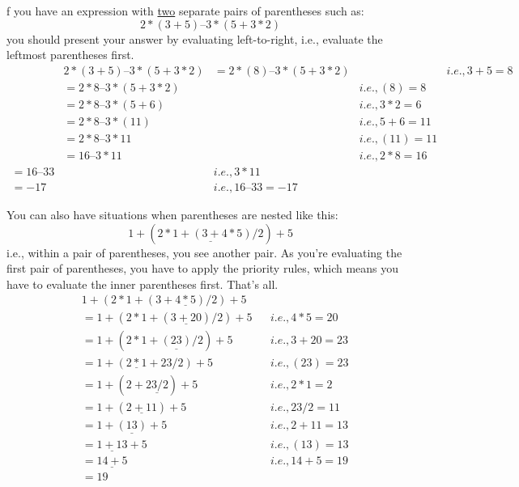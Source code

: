 %
%
%
%

f you have an expression with \underline{two} separate pairs of parentheses such
as:
\[2 * (3 + 5) – 3 * (5 + 3 * 2)\]
you should present your answer by evaluating left-to-right, i.e., evaluate
the leftmost parentheses first.
\begin{align*}
&2 * (3 + 5) – 3 * (5 + 3 * 2)
&= 2 * (8) – 3 * (5 + 3 * 2) & &i.e., 3 + 5 = 8\\
&= 2 * 8 – 3 * (5 + 3 * 2) & &i.e., (8) = 8\\
&= 2 * 8 – 3 * (5 + 6) & &i.e., 3 * 2 = 6\\
&= 2 * 8 – 3 * (11) & &i.e., 5 + 6 = 11 \\
&= 2 * 8 – 3 * 11 & &i.e., (11) = 11 \\
&= 16 – 3 * 11 & &i.e., 2 * 8 = 16\\
= 16 – 33 & &i.e., 3 * 11\\
= -17 & &i.e., 16 – 33 = -17
\end{align*}

%
%

You can also have situations when parentheses are nested like this:
\[1 + (\underline{2 * 1 + (3 + 4 * 5) / 2}) + 5\]
i.e., within a pair of parentheses, you see another pair. As you're
evaluating the first pair of parentheses, you have to apply the priority
rules, which means you have to evaluate the inner parentheses first.
That's all.
\begin{align*}
  &1 + (2 * 1 + (3 + \underline{4 * 5}) / 2) + 5\\
  &= 1 + (2 * 1 + (\underline{3 + 20}) / 2) + 5 & &i.e., 4 * 5 = 20\\
  &= 1 + (2 * 1 + \underline{(23)} / 2) + 5 & &i.e., 3 + 20 = 23\\
  &= 1 + (\underline{2 * 1} + 23 / 2) + 5 & &i.e., (23) = 23\\
  &= 1 + (2 + \underline{23 / 2}) + 5 & &i.e., 2 * 1 = 2\\
  &= 1 + (\underline{2 + 11}) + 5 & &i.e., 23/ 2 = 11\\
  &= 1 + \underline{(13)} + 5 & &i.e., 2 + 11 = 13\\
  &= \underline{1 + 13} + 5 & &i.e., (13) = 13\\
  &= \underline{14 + 5} & &i.e., 14 + 5 = 19\\
  &= 19
\end{align*}

